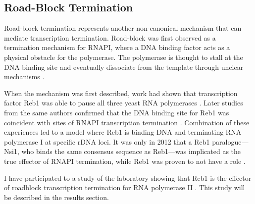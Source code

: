 \subsection{Road-Block Termination} \label{roadblockIntro}
  
Road-block termination represents another non-canonical mechanism that can mediate transcription termination. 
Road-block was first observed as a termination mechanism for RNAPI, where  a DNA binding factor acts as a physical obstacle for the polymerase. 
The polymerase is thought to stall at the DNA binding site and eventually dissociate from the template through unclear mechanisms \cite{lang:1994:model, lang:1993:reb1}. 

When the mechanism was first described, \invitro{} work had shown that transcription factor Reb1 was able to pause all three yeast RNA polymerases \cite{lang:1994:model}. 
Later studies from the same authors confirmed that the DNA binding site for Reb1 was coincident with sites of RNAPI transcription termination \invivo{} \cite{reeder:1999:saccharomyces}. 
Combination of these experiences led to a model where Reb1 is binding DNA and terminating RNA polymerase I at specific rDNA loci. 
It was only in 2012 that a Reb1 paralogue---Nsi1, who binds the same consensus sequence as Reb1---was implicated as the true \invivo{} effector of RNAPI termination, while Reb1 was proven to not have a role \cite{reiter:2012:reb1homologue}. 

I have participated to a study of the laboratory showing that Reb1 is the effector of roadblock transcription termination for RNA polymerase II \invivo{}. 
This study will be described in the results section.

\clearpage

\newpage
\mbox{}
